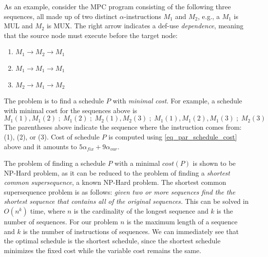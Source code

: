 As an example, consider the MPC program consisting of the following three sequences, all made up of two distinct $\alpha$-instructions $M_1$ and $M_2$, e.g., a $M_1$ is MUL and $M_2$ is MUX. The right arrow indicates a def-use \emph{dependence}, meaning that the source node must execute before the target node: 

\begin{enumerate}
    \item $M_1 \rightarrow M_2 \rightarrow M_1$
    \item $M_1 \rightarrow M_1 \rightarrow M_1$
    \item $M_2 \rightarrow M_1 \rightarrow M_2$
\end{enumerate} 





The problem is to find a schedule $P$ with \emph{minimal cost}. For example, a schedule with minimal cost for the sequences above is 
\[ 
M_1(1), M_1(2) \; ;\; M_1(2) \; ; \; M_2(1), M_2(3) \; ; \; M_1(1), M_1(2), M_1(3) \; ; \;  M_2(3)
\]
The parentheses above indicate the sequence where the instruction comes from: (1), (2), or (3). 
Cost of schedule $P$ is computed using \cref{eq_par_schedule_cost} above and it amounts to $5\alpha_\mathit{fix} + 9\alpha_\mathit{var}$.

The problem of finding a schedule $P$ with a minimal $cost(P)$ is shown to be NP-Hard problem, as it can be reduced to the problem of finding a \emph{shortest common supersequence}, a known NP-Hard problem\cite{Maier1978, Vazirani2010}. The shortest common supersequence problem is as follows: {\it given two or more sequences find the the shortest sequence that contains all of the original sequences.} This can be solved in $O(n^k)$ time, where $n$ is the cardinality of the longest sequence and $k$ is the number of sequences. For our problem $n$ is the maximum length of a sequence and $k$ is the number of instructions of sequences. We can immediately see that the optimal schedule is the shortest schedule, since the shortest schedule minimizes the fixed cost while the variable cost remains the same.

